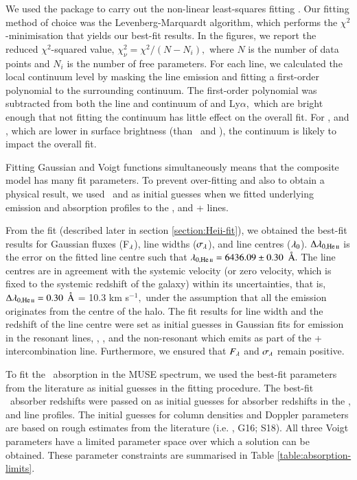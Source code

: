 We used the  package  to carry out the non-linear least-squares fitting \citep{newville2016}. Our fitting method of choice was the Levenberg-Marquardt algorithm, which performs the $\chi^2$-minimisation that yields our best-fit results. In the figures, we report the reduced $\chi^2$-squared value, $\chi_\nu^2 = \chi^2/(N-N_i),$ where $N$ is the number of data points and $N_i$ is the number of free parameters. For each line, we calculated the local continuum level by masking the line emission and fitting a first-order polynomial to the surrounding continuum. The first-order polynomial was subtracted from both the line and continuum of  and Ly$\alpha,$ which are bright enough that not fitting the continuum has little effect on the overall fit. For ,  and , which are lower in surface brightness (than \lya~and ), the continuum is likely to impact the overall fit.

Fitting Gaussian and Voigt functions simultaneously means that the composite model has many fit parameters. To prevent over-fitting and also to obtain a physical result, we used \lya~and  as initial guesses when we fitted underlying emission and absorption profiles to the ,  and +\ion{O}{IV]} lines. 

From the  fit (described later in section \ref{section:Heii-fit}), we obtained the best-fit results for Gaussian fluxes (F$_\lambda$), line widths ($\sigma_\lambda$), and line centres ($\lambda_0$). $\Delta\lam_{0,\ion{He}{II}}$ is the error on the fitted  line centre such that $\lam_{0,\ion{He}{II}} = 6436.09 \pm 0.30$ $\mbox{\normalfont\AA }.$ The line centres are in agreement with the  systemic velocity (or zero velocity, which is fixed to the systemic redshift of the galaxy) within its uncertainties, that is, $\Delta\lam_{0,\ion{He}{II}} = 0.30$ $\mbox{\normalfont\AA }$ = 10.3 km s$^{-1},$ under the assumption that all the emission originates from the centre of the halo. The  fit results for line width and the redshift of the line centre were set as initial guesses in Gaussian fits for emission in the resonant lines, , ,  and the non-resonant \ion{O}{IV],} which emits as part of the +\ion{O}{IV]} intercombination line. Furthermore, we ensured that $F_\lambda$ and $\sigma_\lambda$ remain positive. 

To fit the \lya~absorption in the MUSE spectrum, we used the best-fit parameters from the literature \citep[i.e.][]{jarvis2003,wilman2004} as initial guesses in the fitting procedure. The best-fit \lya~absorber redshifts were passed on as initial guesses for absorber redshifts in the ,  and  line profiles. The initial guesses for column densities and Doppler parameters are based on rough estimates from the literature (i.e. \citealp{jarvis2003,wilman2004}, G16; S18). All three Voigt parameters have a limited parameter space over which a solution can be obtained. These parameter constraints are summarised in Table \ref{table:absorption-limits}. 

